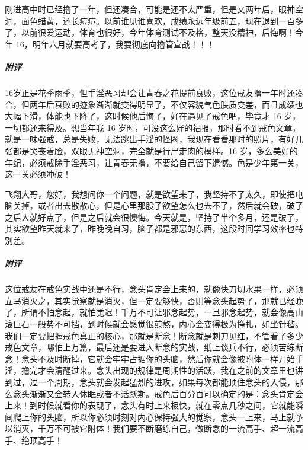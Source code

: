 \begin{case}
    刚进高中时已经撸了一年，但还凑合，可能是还不太严重，但是又两年后，眼神空洞，面色蜡黄，还长痘痘。以前谁见谁喜欢，成绩永远年级前五，现在退到一百多了，以前很爱运动，体育也很好，今年体育测试不及格，整天没精神，后悔啊！今年 16，明年六月就要高考了，我要彻底向撸管宣战！！！
    \subparagraph{附评} 16岁正是花季雨季，但手淫恶习却会让青春之花提前衰败，这位戒友撸一年时还凑合，但两年后衰败的迹象渐渐就变得明显了，不仅容貌气色肤质变差，而且成绩也大幅下滑，体能也下降了，这时候他后悔了，好在遇见了戒色吧，毕竟才 16 岁，一切都还来得及。想当年我 16 岁时，可没这么好的福报，那时看不到戒色文章，就是一味强戒，总是失败，无法跳出手淫的怪圈，我现在看看那时的照片，有好几张都是哭丧着脸，双眼无神空洞，完全就是行尸走肉的模样。16 岁，多么美好的年纪，必须戒除手淫恶习，让青春无撸，不要给自己留下遗憾。色是少年第一关，这一关必须冲破！
\end{case}

\begin{case}
    飞翔大哥，您好，我想问你一个问题，就是欲望来了，我坚持不了太久，即使把电脑关掉，或者出去散散心，但是心里那股子欲望怎么也去不了，然后就会破，破了之后人就好点了，但是之后就会很懊悔。今天就是，坚持了半个多月，还是破了，其实欲望昨天就来了，昨晚晚自习，脑子都是邪恶的东西，这段时间学习效率也特别差。
    \subparagraph{附评} 这位戒友在戒色实战中还是不行，念头肯定会上来的，就像快刀切水果一样，必须立马消灭之，其实觉察就是消灭，但一定要够快，否则等念头起势了，那就已经晚了，所谓不怕念起，就怕觉迟！千万不可让邪念起势，一旦邪念起势，就会像高山滚巨石一般势不可挡，到时候就会感觉很煎熬，内心会变得极为挣扎，如坐针毡。我们一定要把握戒色真正的核心，那就是断念！断念就是刺刀见红，不管看了多少戒色文章，哪怕上万篇，最后还是要进入断念的实战，纸上谈兵不行，必须苦练断念！念头不及时断掉，它就会牢牢占据你的头脑，然后你就会像被附体一样开始手淫，撸完才会清醒过来。念头出现的规律是周期性的活跃，我在之前的文章里也讲到过，过一个周期，念头就会发起猛烈的进攻，如果每次都能顶住念头的入侵，那么念头渐渐又会转入休眠或者不活跃期。戒色后百分百可以确定的是：念头肯定会上来！到时候就看你的表现了，念头有时上来极快，就在零点几秒之间，它就能瞬间爬上你的头脑，所以你必须时刻对内心保持强大的觉察，念头一上来，马上就予以消灭，千万不可被它附体！我们要不断磨练自己，做断念的一流高手、超一流高手、绝顶高手！
\end{case}

